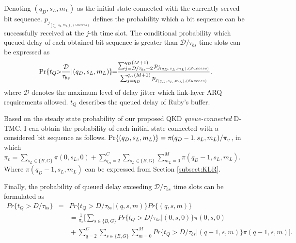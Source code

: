\documentclass[conference]{IEEEtran}
\begin{document}
Denoting $(q_D,s_L,m_L)$ as the initial state connected with the currently served bit sequence. $p_{j_{(q_D,s_L,m_L),(Success)}}$ defines the probability which a bit sequence can be successfully received at the $j$-th time slot. The conditional probability which queued delay of each obtained bit sequence is greater than $\mathcal{D}/\tau_{bs}$ time slots can be expressed as 
\begin{equation}
\label{Delay1}
	\textnormal{Pr}\{t_Q\!\!>\!\!\frac{\mathcal{D}}{\tau_{bs}}|(q_D,s_L,m_L)\}\!\!=\!\!\frac{\sum_{j=\mathcal{D}/\tau_{bs}+2}^{q_D(M+1)}p_{j_{(q_D,s_L,m_L),(Success)}}}{\sum_{j=q_D}^{q_D(M+1)}p_{j_{(q_D,s_L,m_L),(Success)}}}.
\end{equation}
where $\mathcal{D}$ denotes the maximum level of delay jitter which link-layer ARQ requirements allowed. $t_Q$ describes the queued delay of Ruby's buffer. 

Based on the steady state probability of our proposed QKD \textit{queue-connected} D-TMC, I can obtain the probability of each initial state connected with a considered bit sequence as follows. $\textnormal{Pr}\{(q_D,s_L,m_L)\}=\pi(q_D-1,s_L,m_L)/\pi_v$, in which $\pi_v=\sum_{s_L\in\{B,G\}}\pi(0,s_L,0)+\sum_{q_D=2}^{C}\sum_{s_L\in\{B,G\}}\sum_{m_L=0}^{M}\pi(q_D-1,s_L,m_L)$. Where $\pi(q_D-1,s_L,m_L)$ can be expressed from Section \ref{subsect:KLR}.

Finally, the probability of queued delay exceeding $\mathcal{D}/\tau_{bs}$ time slots can be formulated as
\begin{eqnarray}\label{delayOutage}\nonumber
Pr\{t_Q>D/\tau_{bs}\}\!\!\!\!&=&\!\!\!\!Pr\{t_Q>D/\tau_{bs}|(q,s,m)\}Pr\{(q,s,m)\}\\\nonumber
&&\!\!\!\!\!\!\!\!\!\!\!\!\!\!\!\!\!\!\!\!\!\!\!\!\!\!\!\!\!\!\!\!\!\!\!\!\!\!\!\!\!\!\!\!\!\!\!\!\!\!\!\!\!\!\!\!\!\!\!=\frac{1}{\pi_v}[\sum_{s\in\{B,G\}}Pr\{t_Q>D/\tau_{bs}|(0,s,0)\}\pi(0,s,0)\\\nonumber
&&\!\!\!\!\!\!\!\!\!\!\!\!\!\!\!\!\!\!\!\!\!\!\!\!\!\!\!\!\!\!\!\!\!\!\!\!\!\!\!\!\!\!\!\!\!\!\!\!\!\!\!\!\!\!\!\!\!\!\!+\sum_{q=2}^{C}\!\sum_{s\in\{B,G\}}\!\sum_{m=0}^{M}Pr\{t_Q\!>\!D/\tau_{bs}|(q\!-\!1,s,m)\}\pi(q\!-\!1,s,m)].\\
\end{eqnarray}
\end{document}
